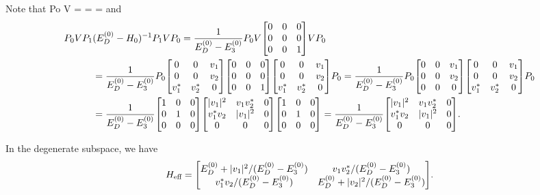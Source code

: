 \begin{solution}
	Note that
	\beq
		Po V \Po = \mqty[ 1 & 0 & 0 \\ 0 & 1 & 0 \\ 0 & 0 & 0 ]  \mqty[ 1 & 0 & 0 \\ 0 & 1 & 0 \\ 0 & 0 & 0 ]
		= \mqty[ 0 & 0 & \vq \\ 0 & 0 & \vw \\ 0 & 0 & 0 ] \mqty[ 1 & 0 & 0 \\ 0 & 1 & 0 \\ 0 & 0 & 0 ]
		= \mqty[ 0 & 0 & 0 \\ 0 & 0 & 0 \\ 0 & 0 & 0 ]
	\eeq
	and
	\begin{align*}
		\Po V \Pq &(\Eod - \Ho)^{-1} \Pq V \Po = \frac{1}{\Eod - \Eoe} \Po V \mqty[ 0 & 0 & 0 \\ 0 & 0 & 0 \\ 0 & 0 & 1] V \Po \\
		&= \frac{1}{\Eod - \Eoe} \Po \mqty[ 0 & 0 & \vq \\ 0 & 0 & \vw \\ \vqs & \vws & 0 ] \mqty[ 0 & 0 & 0 \\ 0 & 0 & 0 \\ 0 & 0 & 1] \mqty[ 0 & 0 & \vq \\ 0 & 0 & \vw \\ \vqs & \vws & 0 ] \Po 
		= \frac{1}{\Eod - \Eoe} \Po \mqty[ 0 & 0 & \vq \\ 0 & 0 & \vw \\ 0 & 0 & 0 ] \mqty[ 0 & 0 & \vq \\ 0 & 0 & \vw \\ \vqs & \vws & 0 ] \Po \\
		&= \frac{1}{\Eod - \Eoe} \mqty[ 1 & 0 & 0 \\ 0 & 1 & 0 \\ 0 & 0 & 0 ] \mqty[|\vq|^2 & \vq \vws & 0 \\ \vqs \vw & |\vq|^2 & 0 \\ 0 & 0 & 0] \mqty[ 1 & 0 & 0 \\ 0 & 1 & 0 \\ 0 & 0 & 0 ]
		= \frac{1}{\Eod - \Eoe} \mqty[|\vq|^2 & \vq \vws & 0 \\ \vqs \vw & |\vq|^2 & 0 \\ 0 & 0 & 0].
	\end{align*}
	
	In the degenerate subspace, we have
	\begin{align*}
		\Heff = \mqty[ \Eod + |\vq|^2/(\Eod - \Eoe) & \vq \vws / (\Eod - \Eoe) \\ \vqs \vw / (\Eod - \Eoe) & \Eod + |\vw|^2/(\Eod - \Eoe)].
	\end{align*}
\end{solution}


